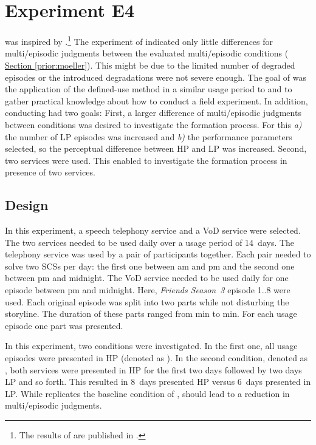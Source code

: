 \section{Experiment E4}
 was inspired by \citet{moller_single-call_2011}.\footnote{The results of  are published in \citet{guse_macro-temporal_2013}.}
The experiment of \citet{moller_single-call_2011} indicated only little differences for multi\-/episodic judgments between the evaluated multi\-/episodic conditions (\cf{} \hyperref[prior:moeller]{Section \ref*{prior:moeller}}).
This might be due to the limited number of degraded episodes or the introduced degradations were not severe enough.
The goal of  was the application of the defined-use method in a similar usage period to \citet{moller_single-call_2011} and to gather practical knowledge about how to conduct a field experiment.
In addition, conducting  had two goals:
First, a larger difference of multi\-/episodic judgments between conditions was desired to investigate the formation process.
For this \emph{a)} the number of \ac{LP} episodes was increased and \emph{b)} the performance parameters selected, so the perceptual difference between \ac{HP} and \ac{LP} was increased.
Second, two services were used.
This enabled to investigate the formation process in presence of two services.

\subsection{Design}
In this experiment, a speech telephony service and a \ac{VoD} service were selected.
The two services needed to be used daily over a usage period of 14~days.
The telephony service was used by a pair of participants together.
Each pair needed to solve two \acp{SCS} per day: the first one between \unit[6]{am} and \unit[1]{pm} and the second one between \unit[3]{pm} and midnight.
The \ac{VoD} service needed to be used daily for one episode between \unit[1]{pm} and midnight.
Here, \emph{Friends Season~3} episode 1..8 were used.
Each original episode was split into two parts while not disturbing the storyline.
The duration of these parts ranged from \unit[12]{min} to \unit[17]{min}.
For each usage episode one part was presented.

In this experiment, two conditions were investigated.
In the first one, all usage episodes were presented in \ac{HP} (denoted as ).
In the second condition, denoted as , both services were presented in \ac{HP} for the first two days followed by two days \ac{LP} and so forth. \label{C9}
This resulted in 8~days presented \ac{HP} versus 6~days presented in \ac{LP}. 
While  replicates the baseline condition of \citet{moller_single-call_2011},  should lead to a reduction in multi\-/episodic judgments.

